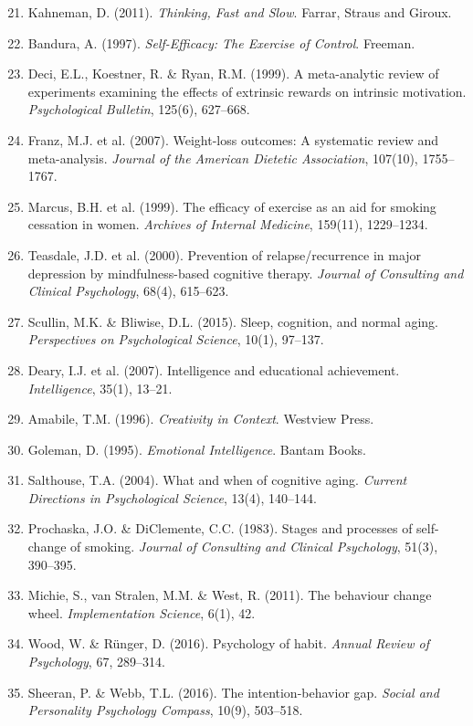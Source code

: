 \begin{enumerate}
    \setcounter{enumi}{20}
    \item Kahneman, D. (2011). \textit{Thinking, Fast and Slow}. Farrar, Straus and Giroux.
    \item Bandura, A. (1997). \textit{Self-Efficacy: The Exercise of Control}. Freeman.
    \item Deci, E.L., Koestner, R. \& Ryan, R.M. (1999). A meta-analytic review of experiments examining the effects of extrinsic rewards on intrinsic motivation. \textit{Psychological Bulletin}, 125(6), 627--668.
    \item Franz, M.J. et al. (2007). Weight-loss outcomes: A systematic review and meta-analysis. \textit{Journal of the American Dietetic Association}, 107(10), 1755--1767.
    \item Marcus, B.H. et al. (1999). The efficacy of exercise as an aid for smoking cessation in women. \textit{Archives of Internal Medicine}, 159(11), 1229--1234.
    \item Teasdale, J.D. et al. (2000). Prevention of relapse/recurrence in major depression by mindfulness-based cognitive therapy. \textit{Journal of Consulting and Clinical Psychology}, 68(4), 615--623.
    \item Scullin, M.K. \& Bliwise, D.L. (2015). Sleep, cognition, and normal aging. \textit{Perspectives on Psychological Science}, 10(1), 97--137.
    \item Deary, I.J. et al. (2007). Intelligence and educational achievement. \textit{Intelligence}, 35(1), 13--21.
    \item Amabile, T.M. (1996). \textit{Creativity in Context}. Westview Press.
    \item Goleman, D. (1995). \textit{Emotional Intelligence}. Bantam Books.
    \item Salthouse, T.A. (2004). What and when of cognitive aging. \textit{Current Directions in Psychological Science}, 13(4), 140--144.
    \item Prochaska, J.O. \& DiClemente, C.C. (1983). Stages and processes of self-change of smoking. \textit{Journal of Consulting and Clinical Psychology}, 51(3), 390--395.
    \item Michie, S., van Stralen, M.M. \& West, R. (2011). The behaviour change wheel. \textit{Implementation Science}, 6(1), 42.
    \item Wood, W. \& Rünger, D. (2016). Psychology of habit. \textit{Annual Review of Psychology}, 67, 289--314.
    \item Sheeran, P. \& Webb, T.L. (2016). The intention-behavior gap. \textit{Social and Personality Psychology Compass}, 10(9), 503--518.
\end{enumerate}

